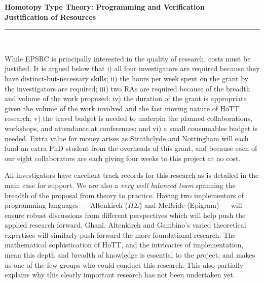 \documentclass[a4paper,11pt]{article}
\begin{document}
\thispagestyle{plain}
\begin{center}
  {\Large \bf Homotopy Type Theory: Programming and Verification\\
\vspace{0.15in}
  Justification of Resources}\\[1ex]

\vspace*{-0.1in}

\rule{160mm}{.5mm}\\[2ex]
\end{center}

\noindent While EPSRC is principally interested in the quality of
research, costs must be justified. It is argued below that i) all four
investigators are required because they have distinct-but-necessary
skills; ii) the hours per week spent on the grant by the investigators
are required; iii) two RAs are required because of the breadth and
volume of the work proposed; iv) the duration of the grant is
appropriate given the volume of the work involved and the fast moving
nature of HoTT research; v) the travel budget is needed to underpin
the planned collaborations, workshops, and attendance at conferences;
and vi) a small consumables budget is needed. Extra value for money
arises as Strathclyde and Nottingham will each fund an extra PhD
student from the overheads of this grant, and because each of our
eight collaborators are each giving four weeks to this project at no
cost. 


\vspace{0.02in}

All investigators have excellent track records for this research as is
detailed in the main case for support.  We are also a {\em very well
  balanced team} spanning the breadth of the proposal from theory to
practice. Having two implementors of programming languages ---
Altenkirch ($\Pi\Sigma$) and McBride (Epigram) --- will ensure robust
discussions from different perspectives which will help push the
applied research forward. Ghani, Altenkirch and Gambino's varied
theoretical expertises will similarly push forward the more
foundational research. The mathematical sophistication of HoTT, and
the intricacies of implementation, mean this depth and breadth of
knowledge is essential to the project, and makes us one of the few groups
who could conduct this research. This also partially explains why this
clearly important research has not been undertaken yet.
\end{document}
